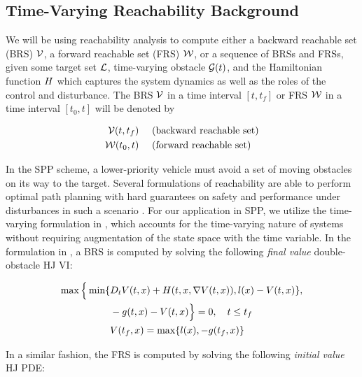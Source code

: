 \subsection{Time-Varying Reachability Background \label{sec:HJIVI}}
We will be using reachability analysis to compute either a backward reachable set (BRS) $\mathcal{V}$, a forward reachable set (FRS) $\mathcal{W}$, or a sequence of BRSs and FRSs, given some target set $\mathcal{L}$, time-varying obstacle $\mathcal{G}(t)$, and the Hamiltonian function $H$ which captures the system dynamics as well as the roles of the control and disturbance. The BRS $\mathcal{V}$ in a time interval $[t, t_f]$ or FRS $\mathcal{W}$ in a time interval $[t_0, t]$ will be denoted by

\begin{equation}
\begin{aligned}
\mathcal{V}(t, t_f) &\quad \text{ (backward reachable set)}\\
\mathcal{W}(t_0, t) &\quad \text{ (forward reachable set)}
\end{aligned}
\end{equation}

In the SPP scheme, a lower-priority vehicle must avoid a set of moving obstacles on its way to the target. Several formulations of reachability are able to perform optimal path planning with hard guarantees on safety and performance under disturbances in such a scenario \cite{Bokanowski11, Fisac15}. For our application in SPP, we utilize the time-varying formulation in \cite{Fisac15}, which accounts for the time-varying nature of systems without requiring augmentation of the state space with the time variable. In the formulation in \cite{Fisac15}, a BRS is computed by solving the following \textit{final value} double-obstacle HJ VI:

\begin{equation}
\label{eq:HJIVI_BRS}
\begin{aligned}
\max \Big\{ \min \{&D_t \valfunc(t, \state) + \ham(t, \state, \nabla \valfunc(t, \state)), \fc(\state) - \valfunc(t, \state) \}, \\
&-\obsfunc(t, \state) - \valfunc(t, \state) \Big\} = 0, \quad t \le t_f \\
&\valfunc(t_f, \state) = \max\{\fc(\state), -\obsfunc(t_f, \state)\}
\end{aligned}
\end{equation}

In a similar fashion, the FRS is computed by solving the following \textit{initial value} HJ PDE:

